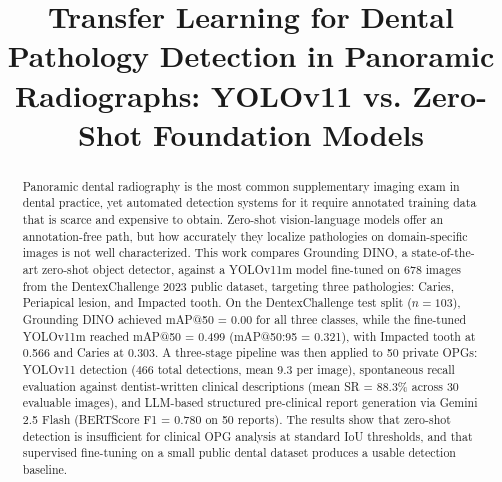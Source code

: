 \documentclass[conference]{IEEEtran}
\begin{document}
\title{Transfer Learning for Dental Pathology Detection in Panoramic Radiographs: YOLOv11 vs. Zero-Shot Foundation Models}

\author{
\and
{}
\and
{}
}

\maketitle

\begin{abstract}
Panoramic dental radiography is the most common supplementary imaging exam in dental practice, yet automated detection systems for it require annotated training data that is scarce and expensive to obtain. Zero-shot vision-language models offer an annotation-free path, but how accurately they localize pathologies on domain-specific images is not well characterized. This work compares Grounding DINO, a state-of-the-art zero-shot object detector, against a YOLOv11m model fine-tuned on 678 images from the DentexChallenge 2023 public dataset, targeting three pathologies: Caries, Periapical lesion, and Impacted tooth. On the DentexChallenge test split ($n = 103$), Grounding DINO achieved mAP@50 = 0.00 for all three classes, while the fine-tuned YOLOv11m reached mAP@50 = 0.499 (mAP@50:95 = 0.321), with Impacted tooth at 0.566 and Caries at 0.303. A three-stage pipeline was then applied to 50 private OPGs: YOLOv11 detection (466 total detections, mean 9.3 per image), spontaneous recall evaluation against dentist-written clinical descriptions (mean SR = 88.3\% across 30 evaluable images), and LLM-based structured pre-clinical report generation via Gemini 2.5 Flash (BERTScore F1 = 0.780 on 50 reports). The results show that zero-shot detection is insufficient for clinical OPG analysis at standard IoU thresholds, and that supervised fine-tuning on a small public dental dataset produces a usable detection baseline.
\end{abstract}
\end{document}
